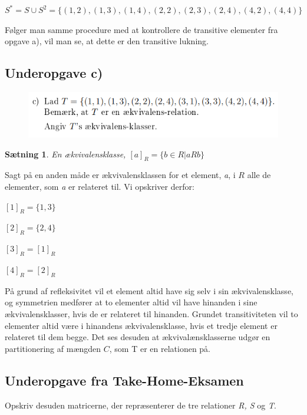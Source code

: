 \documentclass{article}
\newtheorem{theorem}{Sætning}
\begin{document}
\begin{center}
\begin{math}
S^* = S \cup S^2 = \{(1,2), (1,3), (1,4), (2,2), (2,3), (2,4), (4,2), (4,4)\}
\end{math}
\end{center}

Følger man samme procedure med at kontrollere de transitive elementer fra opgave a), vil man se, at dette er den transitive lukning.

\subsection{Underopgave c)}
\begin{figure}[h]
\begin{center}
\includegraphics[scale=0.8]{2015Opgave3FormuleringC}
\end{center}
\end{figure}

\begin{theorem}
En ækvivalensklasse, $[a]_R = \{b \in R | aRb\}$
\end{theorem}

Sagt på en anden måde er ækvivalensklassen for et element, \emph{a}, i $R$ alle de elementer, som \emph{a} er relateret til. Vi opskriver derfor:

\begin{center}
$[1]_R = \{1, 3\}$ \par
$[2]_R = \{2, 4\}$ \par 
$[3]_R = [1]_R$ \par
$[4]_R = [2]_R$
\end{center}

På grund af refleksivitet vil et element altid have sig selv i sin ækvivalensklasse, og symmetrien medfører at to elementer altid vil have hinanden i sine ækvivalensklasser, hvis de er relateret til hinanden. Grundet transitiviteten vil to elementer altid være i hinandens ækvivalensklasse, hvis et tredje element er relateret til dem begge.
Det ses desuden at ækvivalænsklasserne udgør en partitionering af mængden $C$, som T er en relationen på.

\subsection{Underopgave fra Take-Home-Eksamen}
\begin{center}
Opskriv desuden matricerne, der repræsenterer de tre relationer \emph{R, S} og \emph{T}.
\end{center}
\end{document}
